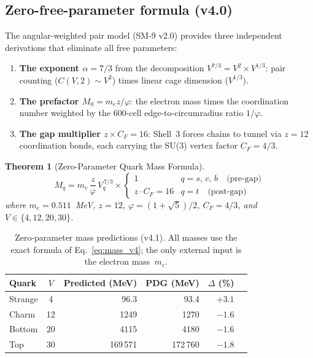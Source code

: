\documentclass[11pt,letterpaper]{article}
\newtheorem{theorem}{Theorem}[section]
\newcommand{\phig}{\varphi}
\begin{document}
\subsection{Zero-free-parameter formula (v4.0)}
\label{sec:zero_param}

The angular-weighted pair model (SM-9 v2.0) provides three
independent derivations that eliminate all free parameters:

\begin{enumerate}
\item \textbf{The exponent $\alpha = 7/3$} from the decomposition
  $V^{7/3} = V^2 \times V^{1/3}$: pair counting ($C(V,2) \sim V^2$)
  times linear cage dimension ($V^{1/3}$).
\item \textbf{The prefactor $M_0 = m_e z / \phig$}: the electron mass
  times the coordination number weighted by the 600-cell
  edge-to-circumradius ratio $1/\phig$.
\item \textbf{The gap multiplier $z \times C_F = 16$}: Shell~3
  forces chains to tunnel via $z = 12$ coordination bonds, each
  carrying the SU(3) vertex factor $C_F = 4/3$.
\end{enumerate}

\begin{theorem}[Zero-Parameter Quark Mass Formula]
\label{thm:mass_v4}
\begin{equation}
\boxed{
  M_q = m_e \,\frac{z}{\phig}\, V_q^{\,7/3}
  \times
  \begin{cases}
    1 & q = s,\, c,\, b \quad\text{(pre-gap)}\\[4pt]
    z \cdot C_F = 16 & q = t \quad\text{(post-gap)}
  \end{cases}
}
\label{eq:mass_v4}
\end{equation}
where $m_e = 0.511$~MeV, $z = 12$, $\phig = (1+\sqrt{5})/2$,
$C_F = 4/3$, and $V \in \{4, 12, 20, 30\}$.
\end{theorem}

\begin{table}[H]
\centering
\caption{Zero-parameter mass predictions (v4.1).  All masses use
the exact formula of Eq.~\eqref{eq:mass_v4}; the only external
input is the electron mass~$m_e$.}
\label{tab:mass_v4}
\begin{tabular}{lcrrrr}
\toprule
Quark & $V$ & Predicted (MeV) & PDG (MeV) & $\Delta$ (\%) \\
\midrule
Strange & 4  &   96.3 &   93.4 & $+3.1$ \\
Charm   & 12 & 1249   & 1270   & $-1.6$ \\
Bottom  & 20 & 4115   & 4180   & $-1.6$ \\
Top     & 30 & 169\,571 & 172\,760 & $-1.8$ \\
\bottomrule
\end{tabular}
\end{table}
\end{document}
